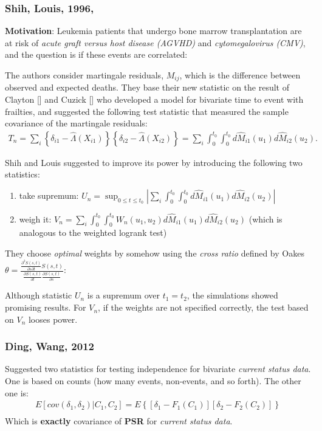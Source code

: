 \documentclass[]{article}
\begin{document}
\subsubsection{Shih, Louis, 1996, \cite{shih1996tests}}
\textbf{Motivation}: Leukemia patients that undergo bone marrow transplantation are at risk of \emph{acute graft versus host disease (AGVHD)} and \emph{cytomegalovirus (CMV)}, and the question is if these events are correlated:

The authors consider martingale residuals, $M_{ij}$, which is the difference between observed and expected deaths. They base their new statistic on the result of Clayton [\cite{clayton1978model}] and Cuzick [\cite{shih1996tests}] who developed a model for bivariate time to event with frailties, and suggested the following test statistic that measured the sample covariance of the martingale residuals:
$$
\begin{aligned}
  T_n=\sum_i \left\{ \delta_{i1} - \hat{\Lambda}(X_{i1}) \right\} \left\{ \delta_{i2} - \hat{\Lambda}(X_{i2}) \right\} =\sum_i \int_0^{t_0}  \int_0^{t_0} d\hat{M}_{i1}(u_1) d\hat{M}_{i2}(u_2).
\end{aligned}
$$ 
 
Shih and Louis suggested to improve its power by introducing the following two statistics:

\begin{enumerate}
	\item take supremum: $U_n= \sup_{0\leq t \leq t_0} \left|\sum_i \int_0^{t_0}  \int_0^{t_0} d\hat{M}_{i1}(u_1) d\hat{M}_{i2}(u_2)\right|$
	\item weigh it: $V_n= \sum_i \int_0^{t_0}  \int_0^{t_0} W_n(u_1,u_2) d\hat{M}_{i1}(u_1) d\hat{M}_{i2}(u_2)$ (which is analogous to the weighted logrank test)
\end{enumerate}
They choose \emph{optimal} weights by somehow using the \emph{cross ratio} defined by Oakes $\theta = \frac{ \frac{\partial^2 S(s,t)}{\partial s \partial t} S(s, t)}    {\frac{\partial S(s, t)}{\partial t} \frac{\partial S(s, t)}{\partial s}}$: 

Although statistic $U_n$ is a supremum over $t_1=t_2$, the simulations showed promising results.
For $V_n$, if the weights are not specified correctly, the test based on $V_n$ looses power.

\subsubsection{Ding, Wang, 2012 \cite{ding2004testing}}
Suggested two statistics for testing independence for bivariate \emph{current status data}. One is based on counts (how many events, non-events, and so forth). The other one is:
	$$
	\begin{aligned}
		 E[cov(\delta_1, \delta_2)|C_1,C_2] = E\left\{ [\delta_1 - F_1(C_1)][\delta_2 - F_2(C_2)]  \right\}\\
	\end{aligned}
	$$
Which is \textbf{exactly} covariance of \textbf{PSR} for \emph{current status data}.
\end{document}
